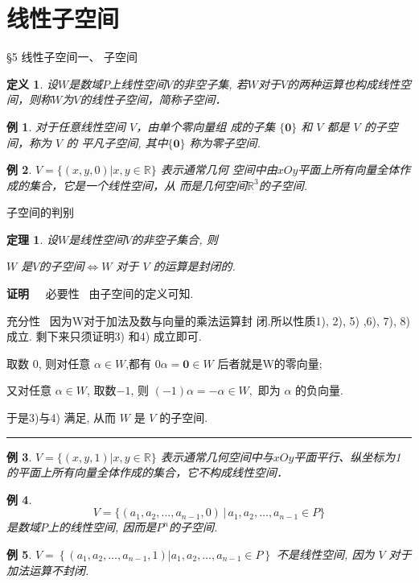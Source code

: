 \documentclass[13pt]{beamer}
\newtheorem{thm}{定理}
\newtheorem{exa}{例}
\newtheorem*{defi}{定义}
\def\qed{\nopagebreak\hfill{\rule{4pt}{7pt}}\medbreak}
\def\pf{{\bf 证明~~ }}
\def\R{\mathbb{R}}
\def\0{\mathbf{0}}
\begin{document}
\section{线性子空间}
\begin{frame}{\S 5  线性子空间}{一、 子空间}
\begin{defi}
设$W$是数域$P$上线性空间$V$的非空子集, 若$W$对于$V$的两种运算也构成线性空间，则称$W$为$V$的\alert{线性子空间}，简称\alert{子空间}．
\end{defi}
\end{frame}

\begin{frame}
\begin{exa}
对于任意线性空间 $V$，由单个零向量组 成的子集 $\{\0\}$ 和 $V$ 都是 $V$ 的子空间，称为 ${V}$ 的 \alert{平凡子空间}, 其中$\{\0\}$ 称为\alert{零子空间}.
\end{exa}

\begin{exa}
$V=\{(x, y, 0) | x, y \in \R\}$ 表示通常几何
空间中由$xOy$平面上所有向量全体作 成的集合，它是一个线性空间，从 而是几何空间$\R^3$的子空间.
\end{exa}
\end{frame}


\begin{frame}{子空间的判别}
\begin{thm}
设$W$是线性空间$V$的非空子集合, 则 
\begin{center}
	$W$ 是$V$的子空间$\Leftrightarrow  {W}$ 对于 $V$ 的运算是封闭的.
\end{center}
\end{thm}
\pf  必要性 \, 由子空间的定义可知.

充分性 \, 因为W对于加法及数与向量的乘法运算封 闭.所以性质1), 2), 5) ,6), 7), 8) 成立.
 剩下来只须证明3) 和4) 成立即可.

取数 $0$, 则对任意 $\alpha \in W$,都有 $0 \alpha={\0} \in W$ 后者就是W的零向量; 

又对任意 $\alpha \in W$, 取数$-1$, 则 $(-1) \alpha=-\alpha \in W,$ 即为 $\alpha$ 的负向量. 

于是3)与4) 满足, 从而 $W$ 是 $V$ 的子空间.
\qed
\end{frame}


\begin{frame}
\begin{exa}
$V = \{ (x, y, 1) | x, y\in \R \}$ 表示通常几何空间中与$xOy$平面平行、纵坐标为1的平面上所有向量全体作成的集合，它不构成线性空间．
\end{exa} 

\begin{exa}
\[
V = \{ ( a_1, a_2, \ldots , a_{n-1}, 0 ) \,  |\,  a_1, a_2, \ldots, a_{n-1} \in P \}
\]
是数域$P$上的线性空间, 因而是$P^n$的子空间.
\end{exa}

\begin{exa}
 $V=\left\{\left(a_{1}, a_{2}, \ldots, a_{n-1}, 1\right) | a_{1}, a_{2}, \ldots, a_{n-1} \in {P}\right\}$
不是线性空间, 因为  $V$  对于加法运算不封闭.
\end{exa}
\end{frame}
\end{document}

